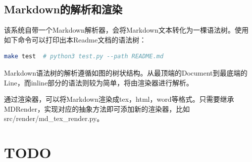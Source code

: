 \documentclass[export, 12pt, letterpaper]{ctexrep}
\begin{document}
\section{Markdown的解析和渲染}
该系统自带一个Markdown解析器，会将Markdown文本转化为一棵语法树。使用如下命令可以打印出本Readme文档的语法树：

\begin{lstlisting}[language=Bash]
make test  # python3 test.py --path README.md
\end{lstlisting}

Markdown语法树的解析遵循如图的树状结构。从最顶端的Document到最底端的Line，而inline部分的语法则较为简单，将由渲染器进行解析。

通过渲染器，可以将Markdown渲染成tex，html，word等格式。只需要继承MDRender，实现对应的抽象方法即可添加新的渲染器，比如src/render/md\_tex\_render.py。




\chapter{TODO}
\end{document}
